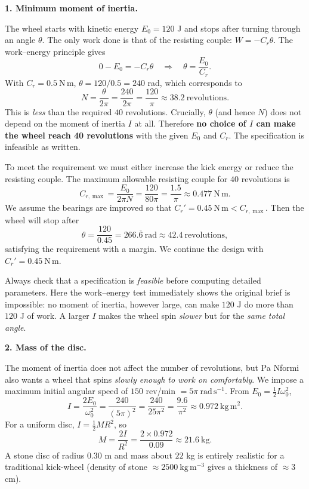 \documentclass[11pt]{article}
\begin{document}
\textbf{1. Minimum moment of inertia.}\par
The wheel starts with kinetic energy $E_0=120$ J and stops after turning through an angle $\theta$. The only work done is that of the resisting couple: $W=-C_r\theta$. The work--energy principle gives
\[
0 - E_0 = -C_r\theta \quad\Longrightarrow\quad \theta = \frac{E_0}{C_r}.
\]
With $C_r=0.5\ \mathrm{N\,m}$, $\theta = 120/0.5 = 240$ rad, which corresponds to
\[
N = \frac{\theta}{2\pi} = \frac{240}{2\pi} = \frac{120}{\pi} \approx 38.2\ \text{revolutions}.
\]
This is \emph{less} than the required $40$ revolutions. Crucially, $\theta$ (and hence $N$) does not depend on the moment of inertia $I$ at all. Therefore \textbf{no choice of $I$ can make the wheel reach 40 revolutions} with the given $E_0$ and $C_r$. The specification is infeasible as written.

To meet the requirement we must either increase the kick energy or reduce the resisting couple. The maximum allowable resisting couple for $40$ revolutions is
\[
C_{r,\max} = \frac{E_0}{2\pi N} = \frac{120}{80\pi} = \frac{1.5}{\pi} \approx 0.477\ \mathrm{N\,m}.
\]
We assume the bearings are improved so that $C_r' = 0.45\ \mathrm{N\,m} < C_{r,\max}$. Then the wheel will stop after
\[
\theta = \frac{120}{0.45} = 266.\overline{6}\ \mathrm{rad} \approx 42.4\ \text{revolutions},
\]
satisfying the requirement with a margin. We continue the design with $C_r' = 0.45\ \mathrm{N\,m}$.

\begin{attention}
Always check that a specification is \emph{feasible} before computing detailed parameters. Here the work--energy test immediately shows the original brief is impossible: no moment of inertia, however large, can make $120$ J do more than $120$ J of work. A larger $I$ makes the wheel spin \emph{slower} but for the \emph{same total angle}.
\end{attention}

\textbf{2. Mass of the disc.}\par
The moment of inertia does not affect the number of revolutions, but Pa Nformi also wants a wheel that spins \emph{slowly enough to work on comfortably}. We impose a maximum initial angular speed of $150$ rev/min $= 5\pi\ \mathrm{rad\,s^{-1}}$. From $E_0 = \tfrac12 I\omega_0^2$,
\[
I = \frac{2E_0}{\omega_0^2} = \frac{240}{(5\pi)^2} = \frac{240}{25\pi^2} = \frac{9.6}{\pi^2} \approx 0.972\ \mathrm{kg\,m^2}.
\]
For a uniform disc, $I = \tfrac12 MR^2$, so
\[
M = \frac{2I}{R^2} = \frac{2 \times 0.972}{0.09} \approx 21.6\ \mathrm{kg}.
\]
A stone disc of radius $0.30$ m and mass about $22$ kg is entirely realistic for a traditional kick-wheel (density of stone $\approx 2500\ \mathrm{kg\,m^{-3}}$ gives a thickness of $\approx 3$ cm).
\end{document}
